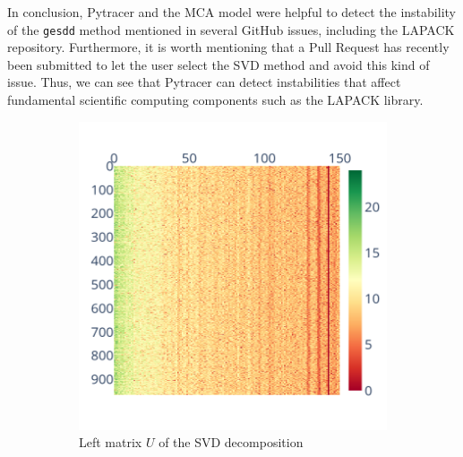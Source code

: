 \documentclass[11pt]{article}
\newcommand{\tristan}[1]{\color{orange}\textbf{From Tristan:} #1\color{black}\xspace}
\begin{document}
In conclusion, Pytracer and the MCA model were helpful to detect the instability of the \texttt{gesdd} method mentioned in several GitHub issues, including the LAPACK repository. Furthermore, it is worth mentioning that a Pull Request has recently been submitted to let the user select the SVD method and avoid this kind of issue. Thus, we can see that Pytracer can detect instabilities that affect fundamental scientific computing components such as the LAPACK library.



\begin{figure}
    \centering
    \begin{subfigure}{0.3\linewidth}
    \includegraphics[width=\linewidth]{figure/face_recognition/randomized_svd_ret_U_sig_zoom.png}
    \caption{Left matrix $U$ of the SVD decomposition}
    \label{fig:randomized_svd_U}
    \end{subfigure}
    \begin{subfigure}{0.3\linewidth}

\end{subfigure}
\end{figure}
\end{document}
